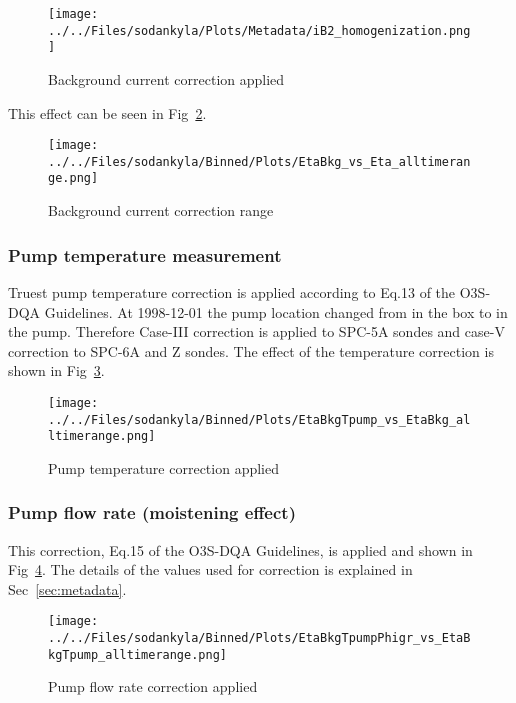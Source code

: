                \begin{figure}
        \centering
\texttt{[image: ../../Files/sodankyla/Plots/Metadata/iB2\_homogenization.png]}
    \caption{Background current correction applied}
            \label{fig:bkg_hom}
    \end{figure}
This effect can be seen in  Fig~\ref{fig:bkg}.

                \begin{figure}
        \centering
\texttt{[image: ../../Files/sodankyla/Binned/Plots/EtaBkg\_vs\_Eta\_alltimerange.png]}
    \caption{Background current correction range}
            \label{fig:bkg}
    \end{figure}

            \subsubsection{Pump temperature measurement}
 Truest pump temperature correction is applied according to Eq.13 of the O3S-DQA Guidelines. At 1998-12-01 the pump location changed from in the box to in the pump.
    Therefore Case-III correction is applied to SPC-5A sondes and case-V correction to SPC-6A and Z sondes. The effect of the temperature correction
is shown in  Fig~\ref{fig:tpump}.


                    \begin{figure}
        \centering
\texttt{[image: ../../Files/sodankyla/Binned/Plots/EtaBkgTpump\_vs\_EtaBkg\_alltimerange.png]}
    \caption{Pump temperature correction applied}
            \label{fig:tpump}
    \end{figure}

                \subsubsection{Pump flow rate (moistening effect)}
    This correction, Eq.15 of the O3S-DQA Guidelines, is applied and shown in Fig~\ref{fig:pf_ptu}. The details of the values used for
    correction is explained in Sec~\ref{sec:metadata}.

                        \begin{figure}
        \centering
\texttt{[image: ../../Files/sodankyla/Binned/Plots/EtaBkgTpumpPhigr\_vs\_EtaBkgTpump\_alltimerange.png]}
    \caption{Pump flow rate correction applied}
            \label{fig:pf_ptu}
    \end{figure}

